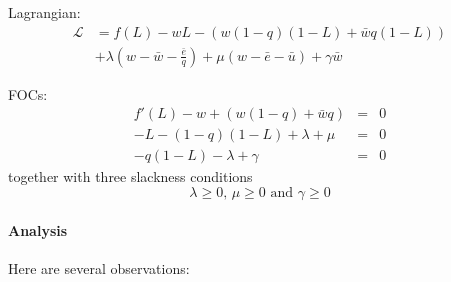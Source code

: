 \documentclass[12pt]{article}
\begin{document}
 Lagrangian:
 \begin{align*}
 	\mathcal{L} & = f(L) - w L - \left(w (1-q) (1-L) + \bar{w} q (1-L)\right) \\ & + \lambda \left(w - \bar{w} - \frac{\bar{e}}{q} \right) + \mu (w - \bar{e} - \bar{u}) + \gamma \bar{w}
 \end{align*}

FOCs:
\begin{eqnarray}
	f'(L) - w + (w (1-q) + \bar{w} q) &=& 0 \\
	-L - (1-q)(1-L) + \lambda + \mu &=& 0 \\
	- q(1-L) - \lambda+ \gamma &=& 0
\end{eqnarray}
together with three slackness conditions
\[\lambda \geq 0 \text{, } \mu \geq 0 \text{ and } \gamma \geq 0\]

\paragraph{Analysis \\ [6pt]}
Here are several observations:
\end{document}
